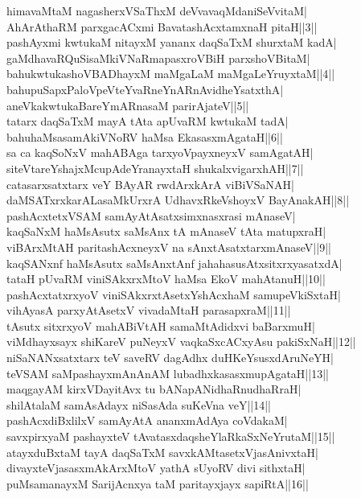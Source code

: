 \documentclass{article}
\begin{document}
himavaMtaM nagasherxVSaThxM deVvavaqMdaniSeVvitaM|\\
AhArAthaRM parxgacACxmi BavatashAcxtamxnaH pitaH||3||\\
pashAyxmi kwtukaM nitayxM yananx daqSaTxM shurxtaM kadA|\\
gaMdhavaRQuSisaMkiVNaRmapasxroVBiH parxshoVBitaM|\\
bahukwtukashoVBADhayxM maMgaLaM maMgaLeYruyxtaM||4||\\
bahupuSapxPaloVpeVteYvaRneYnARnAvidheYsatxthA|\\
aneVkakwtukaBareYmARnasaM parirAjateV||5||\\
tatarx daqSaTxM mayA tAta apUvaRM kwtukaM tadA|\\
bahuhaMsasamAkiVNoRV haMsa EkasasxmAgataH||6||\\
sa ca kaqSoNxV mahABAga tarxyoVpayxneyxV samAgatAH|\\
siteVtareYshajxMcupAdeYranayxtaH shukalxvigarxhAH||7||\\
catasarxsatxtarx veY BAyAR rwdArxkArA viBiVSaNAH|\\
daMSATxrxkarALasaMkUrxrA UdhavxRkeVshoyxV BayAnakAH||8||\\
pashAcxtetxVSAM samAyAtAsatxsimxnasxrasi mAnaseV|\\
kaqSaNxM haMsAsutx saMsAnx tA mAnaseV tAta matupxraH|\\
viBArxMtAH paritashAcxneyxV na sAnxtAsatxtarxmAnaseV||9||\\
kaqSANxnf haMsAsutx saMsAnxtAnf jahahasusAtxsitxrxyasatxdA|\\
tataH pUvaRM viniSAkxrxMtoV haMsa EkoV mahAtanuH||10||\\
pashAcxtatxrxyoV viniSAkxrxtAsetxYshAcxhaM samupeVkiSxtaH|\\
vihAyasA parxyAtAsetxV vivadaMtaH parasapxraM||11||\\
tAsutx sitxrxyoV mahABiVtAH samaMtAdidxvi baBarxmuH|\\
viMdhayxsayx shiKareV puNeyxV vaqkaSxcACxyAsu pakiSxNaH||12||\\
niSaNANxsatxtarx teV saveRV dagAdhx duHKeYsusxdAruNeYH|\\
teVSAM saMpashayxmAnAnAM lubadhxkasasxmupAgataH||13||\\
maqgayAM kirxVDayitAvx tu bANapANidhaRnudhaRraH|\\
shilAtalaM samAsAdayx niSasAda suKeVna veY||14||\\
pashAcxdiBxlilxV samAyAtA ananxmAdAya coVdakaM|\\
savxpirxyaM pashayxteV tAvatasxdaqsheYlaRkaSxNeYrutaM||15||\\
atayxduBxtaM tayA daqSaTxM savxkAMtasetxVjasAnivxtaH|\\
divayxteVjasasxmAkArxMtoV yathA sUyoRV divi sithxtaH|\\
puMsamanayxM SarijAcnxya taM paritayxjayx sapiRtA||16||\\
\end{document}
